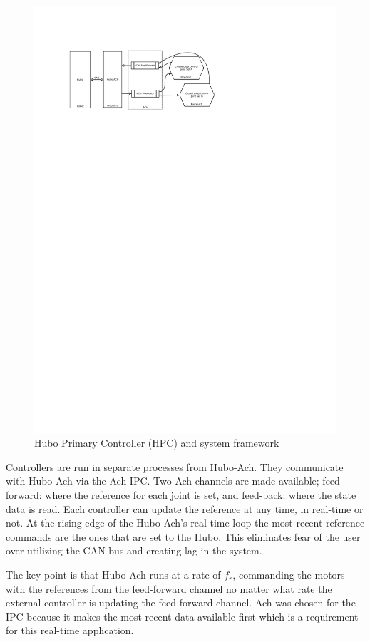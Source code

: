\begin{figure}[thpb]
  \centering
\includegraphics[width=1.0\columnwidth]{./pix/hubo-ach-diagram.pdf}
  \caption{Hubo Primary Controller (HPC) and system framework}
  \label{fig:graph}
\end{figure}


Controllers are run in separate processes from Hubo-Ach.
They communicate with Hubo-Ach via the Ach IPC.
Two Ach channels are made available; feed-forward: where the reference for each joint is set, and feed-back: where the state data is read.
Each controller can update the reference at any time, in real-time or not.
At the rising edge of the Hubo-Ach's real-time loop the most recent reference commands are the ones that are set to the Hubo.
This eliminates fear of the user over-utilizing the CAN bus and creating lag in the system.

The key point is that Hubo-Ach runs at a rate of $f_r$, commanding the motors with the references from the feed-forward channel no matter what rate the external controller is updating the feed-forward channel.  
Ach was chosen for the IPC because it makes the most recent data available first which is a requirement for this real-time application.

